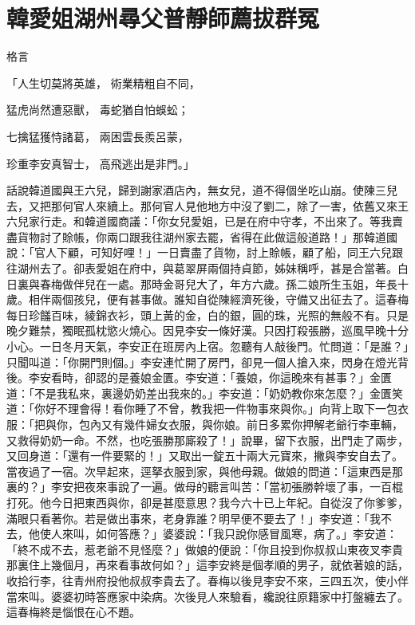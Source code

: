 %

\chapter{韓愛姐湖州尋父\KG 普靜師薦拔群冤}

格言

「人生切莫將英雄，  術業精粗自不同，

猛虎尚然遭惡獸，  毒蛇猶自怕蜈蚣；

七擒猛獲恃諸葛，  兩困雲長羨呂蒙，

珍重李安真智士，  高飛逃出是非門。」

話說韓道國與王六兒，歸到謝家酒店內，無女兒，道不得個坐吃山崩。使陳三兒去，又把那何官人來續上。那何官人見他地方中沒了劉二，除了一害，依舊又來王六兒家行走。和韓道國商議：「你女兒愛姐，已是在府中守孝，不出來了。等我賣盡貨物討了賒帳，你兩口跟我往湖州家去罷，省得在此做這般道路！」那韓道國說：「官人下顧，可知好哩！」一日賣盡了貨物，討上賒帳，顧了船，同王六兒跟往湖州去了。卻表愛姐在府中，與葛翠屏兩個持貞節，姊妹稱呼，甚是合當著。白日裏與春梅做伴兒在一處。那時金哥兒大了，年方六歲。孫二娘所生玉姐，年長十歲。相伴兩個孩兒，便有甚事做。誰知自從陳經濟死後，守備又出征去了。這春梅每日珍饈百味，綾錦衣衫，頭上黃的金，白的銀，圓的珠，光照的無般不有。只是晚夕難禁，獨眠孤枕慾火燒心。因見李安一條好漢。只因打殺張勝，巡風早晚十分小心。一日冬月天氣，李安正在班房內上宿。忽聽有人敲後門。忙問道：「是誰？」只聞叫道：「你開門則個。」李安連忙開了房門，卻見一個人搶入來，閃身在燈光背後。李安看時，卻認的是養娘金匱。李安道：「養娘，你這晚來有甚事？」金匱道：「不是我私來，裏邊奶奶差出我來的。」李安道：「奶奶教你來怎麼？」金匱笑道：「你好不理會得！看你睡了不曾，教我把一件物事來與你。」向背上取下一包衣服：「把與你，包內又有幾件婦女衣服，與你娘。前日多累你押解老爺行李車輛，又救得奶奶一命。不然，也吃張勝那廝殺了！」說畢，留下衣服，出門走了兩步，又回身道：「還有一件要緊的！」又取出一錠五十兩大元寶來，撇與李安自去了。當夜過了一宿。次早起來，逕拏衣服到家，與他母親。做娘的問道：「這東西是那裏的？」李安把夜來事說了一遍。做母的聽言叫苦：「當初張勝幹壞了事，一百棍打死。他今日把東西與你，卻是甚麼意思？我今六十已上年紀。自從沒了你爹爹，滿眼只看著你。若是做出事來，老身靠誰？明早便不要去了！」李安道：「我不去，他使人來叫，如何答應？」婆婆說：「我只說你感冒風寒，病了。」李安道：「終不成不去，惹老爺不見怪麼？」做娘的便說：「你且投到你叔叔山東夜叉李貴那裏住上幾個月，再來看事故何如？」這李安終是個孝順的男子，就依著娘的話，收拾行李，往青州府投他叔叔李貴去了。春梅以後見李安不來，三四五次，使小伴當來叫。婆婆初時答應家中染病。次後見人來驗看，纔說往原籍家中打盤纏去了。這春梅終是惱恨在心不題。

